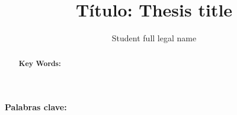 \documentclass[a4paper,10pt,titlepage,twoside,openany]{thesis}
\title{Título: Thesis title}
\author{Student full legal name}
\begin{document}
\prepages
\maketitle
\authorshippage
\publicationpage


\begin{dedication}

\end{dedication}

\begin{acknowledgements}

\end{acknowledgements}

\begin{resumen}

\vspace*{1cm}

\textbf{Palabras clave:}

\end{resumen}

\begin{abstract}

\vspace*{1cm}

\textbf{Key Words:}

\end{abstract}


\tableofcontents

\listoffigures

\listoftables


%
%
%
\end{document}
